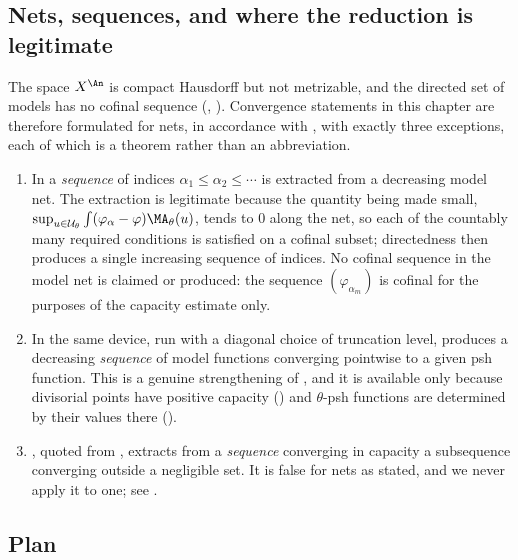 \subsection{Nets, sequences, and where the reduction is legitimate}
\label{sec:ch25-nets}

The space \(X^{\An}\) is compact Hausdorff but not metrizable, and the
directed set of models has no cofinal sequence
(,
).  Convergence statements in this chapter
are therefore formulated for nets, in accordance with
, with exactly three exceptions, each of
which is a theorem rather than an abbreviation.

\begin{enumerate}
\item\label{itm:ch25-seq:chebyshev}
 In  a \emph{sequence} of indices
 \(\alpha_1\leq\alpha_2\leq\cdots\) is extracted from a decreasing model
 net.  The extraction is legitimate because the quantity being made small,
 \(\sup_{u\in\mathcal U_\theta}\int(\varphi_\alpha-\varphi)\MA_\theta(u)\),
 tends to \(0\) along the net, so each of the countably many required
 conditions is satisfied on a cofinal subset; directedness then produces a
 single increasing sequence of indices.  No cofinal sequence in the model
 net is claimed or produced: the sequence \((\varphi_{\alpha_m})\) is
 cofinal for the purposes of the capacity estimate only.
\item\label{itm:ch25-seq:diag}
 In  the same device, run with a
 diagonal choice of truncation level, produces a decreasing
 \emph{sequence} of model functions converging pointwise to a given psh
 function.  This is a genuine strengthening of
 , and it is available only because
 divisorial points have positive capacity
 () and \(\theta\)-psh functions are
 determined by their values there ().
\item\label{itm:ch25-seq:subseq}
 , quoted from
 , extracts from a \emph{sequence} converging
 in capacity a subsequence converging outside a negligible set.  It is
 false for nets as stated, and we never apply it to one; see
 .
\end{enumerate}

\subsection{Plan}
\label{sec:ch25-plan}

